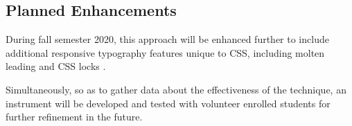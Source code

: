 \documentclass[sigconf,sigplan,review,anonymous]{acmart}
\begin{document}
\subsection{Planned Enhancements}

During fall semester 2020, this approach will be enhanced further to include additional responsive typography features unique to CSS, including molten leading and CSS locks \cite{tb:ml,tb:cl}.

Simultaneously, so as to gather data about the effectiveness of the technique, an instrument will be developed and tested with volunteer enrolled students for further refinement in the future.



\end{document}
